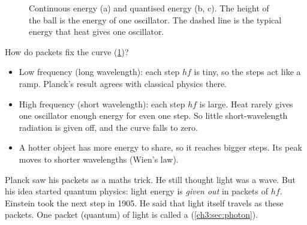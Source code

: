 \begin{figure}
  \caption{Continuous energy (a) and quantised energy (b, c). The height of the ball
    is the energy of one oscillator. The dashed line is the typical energy that heat
    gives one oscillator.}\label{ch3:fig:stairs}
\end{figure}

How do packets fix the curve (\cref{ch3:fig:stairs})?
\begin{itemize}
  \item Low frequency (long wavelength): each step $hf$ is tiny, so the steps act
        like a ramp. Planck's result agrees with classical physics there.
  \item High frequency (short wavelength): each step $hf$ is large. Heat rarely gives
        one oscillator enough energy for even one step. So little short-wavelength
        radiation is given off, and the curve falls to zero.
  \item A hotter object has more energy to share, so it reaches bigger steps. Its
        peak moves to shorter wavelengths (Wien's law).
\end{itemize}

Planck saw his packets as a maths trick. He still thought light was a wave. But
his idea started quantum physics: light energy is \emph{given out} in packets of
$hf$. Einstein took the next step in 1905. He said that light itself travels as
these packets. One packet (quantum) of light is called a 
(\cref{ch3:sec:photon}).

